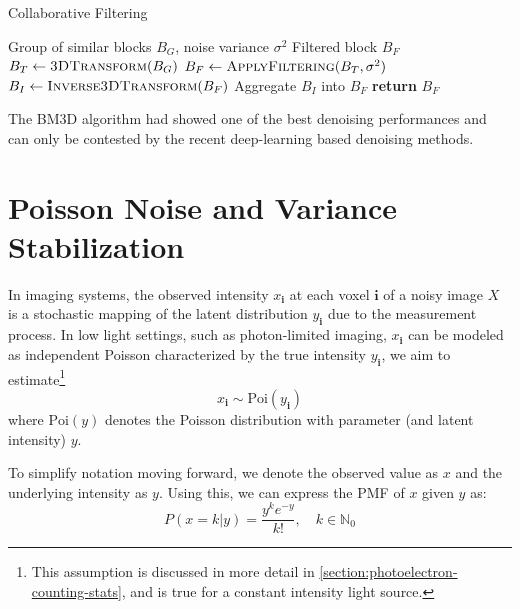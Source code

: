 \begin{algorithm}
    \caption{Collaborative Filtering}\label{alg:collaborativefiltering}
    \begin{algorithmic}[1]
    \Require Group of similar blocks $B_{G}$, noise variance $\sigma^2$
    \Ensure Filtered block $B_{F}$
        \State $B_{T} \gets \textsc{3DTransform}(B_{G})$
        \State $B_{F} \gets \textsc{ApplyFiltering}(B_{T}, \sigma^2)$
        \State $B_{I} \gets \textsc{Inverse3DTransform}(B_{F})$
        \State Aggregate $B_{I}$ into $B_{F}$
        \State \textbf{return} $B_{F}$
    \EndProcedure
    \end{algorithmic}
\end{algorithm}

The \gls{BM3D} algorithm had showed one of the best denoising performances and can only be contested by the recent deep-learning based denoising methods. 

\section{Poisson Noise and Variance Stabilization}\label{sec:poisson-noise-model}
In imaging systems, the observed intensity $x_{\mathbf{i}}$ at each voxel $\mathbf{i}$ of a noisy image $X$ is a stochastic mapping of the latent distribution $y_{\mathbf{i}}$ due to the measurement process. In low light settings, such as photon-limited imaging, $x_{\mathbf{i}}$ can be modeled as independent Poisson characterized by the true intensity $y_{\mathbf{i}}$, we aim to estimate\footnote{This assumption is discussed in more detail in \cref{section:photoelectron-counting-stats}, and is true for a constant intensity light source.} \cite{makitaloOptimalInversionAnscombe2011,kimDeepLearningbasedStatistical2021} 
\begin{equation*}
    x_{\mathbf{i}} \sim \text{Poi}(y_{\mathbf{i}})
\end{equation*}
where $\text{Poi}(y)$ denotes the Poisson distribution with parameter (and latent intensity) $y$. 

To simplify notation moving forward, we denote the observed value as $x$ and the underlying intensity as $y$. Using this, we can express the \gls{PMF} of $x$ given $y$  as:
\begin{equation}\label{eq:poisson-pmf-1}
    P(x = k| y) = \frac{y^k e^{-y}}{k!} , \quad k \in \mathbb{N}_0
\end{equation}


